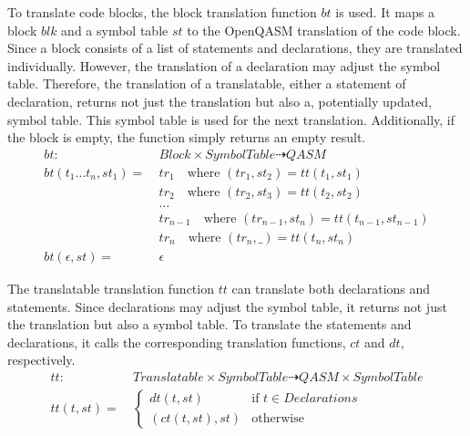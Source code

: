 To translate code blocks, the block translation function $bt$ is used. It maps a block $blk$ and a symbol table $st$ to the OpenQASM translation of the code block. Since a block consists of a list of statements and declarations, they are translated individually. However, the translation of a declaration may adjust the symbol table. Therefore, the translation of a translatable, \ie either a statement of declaration, returns not just the translation but also a, potentially updated, symbol table. This symbol table is used for the next translation. Additionally, if the block is empty, the function simply returns an empty result.
\begin{align*}
    bt : \ & Block \times SymbolTable \dashrightarrow QASM\\
    bt(t_1 \dots t_n, st_1) = \ &  tr_1 \quad \text{where } (tr_1, st_2) = tt(t_1, st_1)\\
    & tr_2 \quad \text{where } (tr_2, st_3) = tt(t_2, st_2)\\
    & \dots\\
    & tr_{n-1} \quad \text{where } (tr_{n - 1}, st_n) = tt(t_{n - 1}, st_{n - 1})\\
    & tr_n \quad \text{where } (tr_n, \_) = tt(t_n, st_n)\\
    bt(\epsilon, st) = \ &  \epsilon 
\end{align*}

The translatable translation function $tt$ can translate both declarations and statements. Since declarations may adjust the symbol table, it returns not just the translation but also a symbol table. To translate the statements and declarations, it calls the corresponding translation functions, $ct$ and $dt$, respectively.
\begin{align*}
    tt : \ & Translatable \times SymbolTable \dashrightarrow QASM \times SymbolTable\\
    tt(t, st) = \ & \begin{cases}
        dt(t, st)  \quad &\text{if } t \in Declarations\\
        (ct(t, st), st) &\text{otherwise }
    \end{cases}  
\end{align*}

